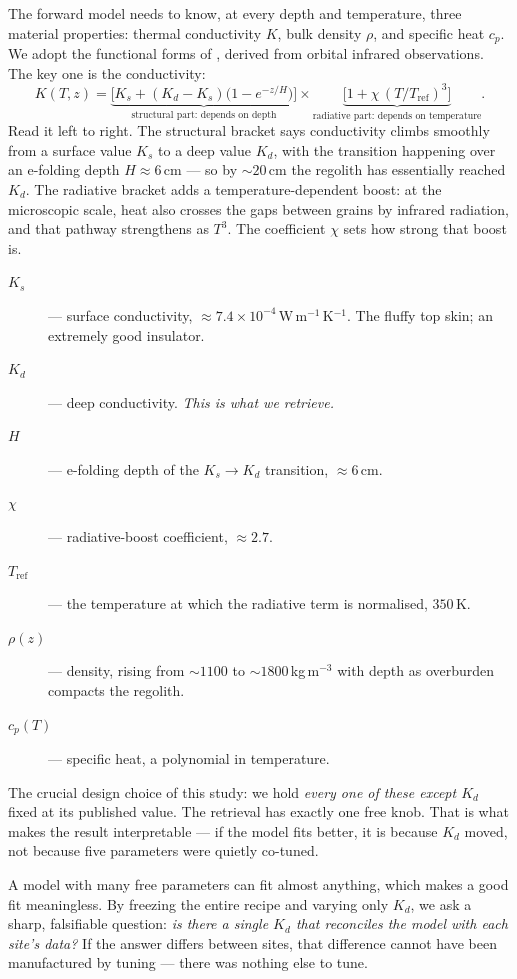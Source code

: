 \documentclass[11pt]{report}
\begin{document}
The forward model needs to know, at every depth and temperature,
three material properties: thermal conductivity $K$, bulk density
$\rho$, and specific heat $c_p$. We adopt the functional forms of
\citet{hayne2017}, derived from orbital infrared observations. The
key one is the conductivity:
\[
K(T,z) = \underbrace{\Big[K_s + (K_d-K_s)\big(1-e^{-z/H}\big)\Big]}
         _{\text{structural part: depends on depth}}
       \times
         \underbrace{\Big[1 + \chi\,(T/T_\mathrm{ref})^3\Big]}
         _{\text{radiative part: depends on temperature}}.
\]
Read it left to right. The structural bracket says conductivity
climbs smoothly from a surface value $K_s$ to a deep value $K_d$,
with the transition happening over an e-folding depth $H\approx 6$\,cm
--- so by $\sim\!20$\,cm the regolith has essentially reached $K_d$.
The radiative bracket adds a temperature-dependent boost: at the
microscopic scale, heat also crosses the gaps between grains by
infrared radiation, and that pathway strengthens as $T^3$. The
coefficient $\chi$ sets how strong that boost is.

\begin{description}
\item[$K_s$] --- surface conductivity, $\approx 7.4\times10^{-4}$\,W\,m$^{-1}$\,K$^{-1}$.
  The fluffy top skin; an extremely good insulator.
\item[$K_d$] --- deep conductivity. \emph{This is what we retrieve.}
\item[$H$] --- e-folding depth of the $K_s\!\to\!K_d$ transition,
  $\approx 6$\,cm.
\item[$\chi$] --- radiative-boost coefficient, $\approx 2.7$.
\item[$T_\mathrm{ref}$] --- the temperature at which the radiative
  term is normalised, $350$\,K.
\item[$\rho(z)$] --- density, rising from $\sim\!1100$ to
  $\sim\!1800$\,kg\,m$^{-3}$ with depth as overburden compacts the
  regolith.
\item[$c_p(T)$] --- specific heat, a polynomial in temperature.
\end{description}

The crucial design choice of this study: we hold \emph{every one of
these except $K_d$} fixed at its published value. The retrieval has
exactly one free knob. That is what makes the result interpretable
--- if the model fits better, it is because $K_d$ moved, not because
five parameters were quietly co-tuned.

\begin{aside}
A model with many free parameters can fit almost anything, which
makes a good fit meaningless. By freezing the entire \citet{hayne2017}
recipe and varying only $K_d$, we ask a sharp, falsifiable question:
\emph{is there a single $K_d$ that reconciles the model with each
site's data?} If the answer differs between sites, that difference
cannot have been manufactured by tuning --- there was nothing else
to tune.
\end{aside}
\end{document}
